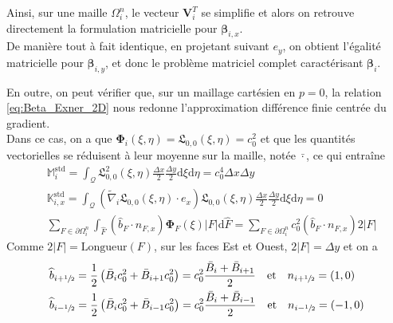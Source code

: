 \documentclass[11pt, a4paper, oneside]{report}
\newcommand{\LegendreL}{\mathfrak{L}}
\begin{document}
\noindent
Ainsi, sur une maille $\Omega_i^n$, le vecteur $\bm{V}_i^T$ se simplifie et alors on retrouve directement la formulation matricielle pour $\bm{\beta}_{i, x}$. \\
De manière tout à fait identique, en projetant suivant $e_y$, on obtient l'égalité matricielle pour $\bm{\beta}_{i, y}$, et donc le problème matriciel complet caractérisant $\bm{\beta}_i$.

En outre, on peut vérifier que, sur un maillage cartésien en $p = 0$, la relation \eqref{eq:Beta_Exner_2D} nous redonne l'approximation différence finie centrée du gradient. \\
Dans ce cas, on a que $\bm{\Phi}_i(\xi, \eta) = \LegendreL_{0, 0}(\xi, \eta) = c_0^2$ et que les quantités vectorielles se réduisent à leur moyenne sur la maille, notée $\bar{\cdot}$, ce qui entraîne
\begin{equation}
    \begin{aligned}
        & \mathbb{M}_i^\text{std} = \int_{\mathcal{Q}} \LegendreL_{0, 0}^2(\xi, \eta) \frac{\Delta x}{2} \frac{\Delta y}{2} \text{d}\xi \text{d}\eta = c_0^4 \Delta x \Delta y \\
        & \mathbb{K}_{i, x}^\text{std} = \int_{\mathcal{Q}} \left( \widetilde{\nabla}_i \LegendreL_{0, 0}(\xi, \eta) \cdot e_x \right) \LegendreL_{0, 0}(\xi, \eta) \frac{\Delta x}{2} \frac{\Delta y}{2} \text{d}\xi \text{d}\eta = 0 \\
        & \sum_{F \in \partial \Omega_i^n} \int_{\widehat{F}} \left( \widehat{b}_F \cdot n_{F, x} \right) \bm{\Phi}_F(\xi) \lvert F \rvert \text{d}\widehat{F} = \sum_{F \in \partial \Omega_i^n} c_0^2 \left( \widehat{b}_F \cdot n_{F, x} \right) 2 \lvert F \rvert
    \end{aligned}
\end{equation}
Comme $2 \lvert F \rvert = \text{Longueur}(F)$, sur les faces Est et Ouest, $2 \lvert F \rvert = \Delta y$ et on a
\begin{equation}
    \begin{aligned}
        & \widehat{b}_{i+\sfrac{1}{2}} = \frac{1}{2} \left(\bar{B}_i c_0^2 + \bar{B}_{i+1} c_0^2 \right) = c_0^2 \frac{\bar{B}_i + \bar{B}_{i+1}}{2} \quad \text{et} \quad n_{i+\sfrac{1}{2}} = (1, 0) \\
        & \widehat{b}_{i-\sfrac{1}{2}} = \frac{1}{2} \left(\bar{B}_i c_0^2 + \bar{B}_{i-1} c_0^2 \right) = c_0^2 \frac{\bar{B}_i + \bar{B}_{i-1}}{2} \quad \text{et} \quad n_{i-\sfrac{1}{2}} = (-1, 0)
    \end{aligned}
\end{equation}
\end{document}
